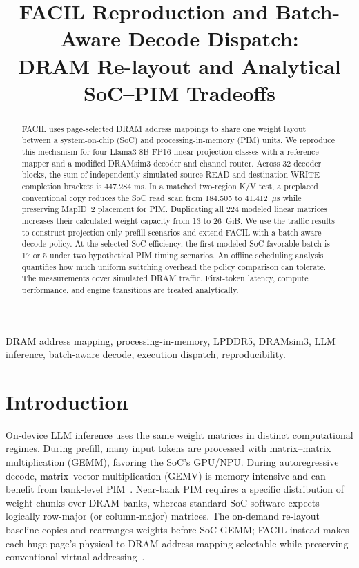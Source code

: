 \documentclass[conference,10pt]{IEEEtran}
\title{FACIL Reproduction and Batch-Aware Decode Dispatch:\\
DRAM Re-layout and Analytical SoC--PIM Tradeoffs}
\author{\IEEEauthorblockN{Sukhjot Singh, T S S Sreeja, Mayank Singh, and Pankaj}
\IEEEauthorblockA{Group 9, Department of Computer Science and Engineering\\
Indian Institute of Technology Guwahati}}
\newcommand{\facil}{FACIL}
\begin{document}
\maketitle
\begin{abstract}
FACIL uses page-selected DRAM address mappings to share one
weight layout between a system-on-chip (SoC) and processing-in-memory
(PIM) units. We reproduce this mechanism for four Llama3-8B FP16
linear projection classes with a reference mapper and a modified
DRAMsim3 decoder and channel router. Across 32 decoder blocks,
the sum of independently simulated source READ and destination WRITE
completion brackets is 447.284 ms. In a matched two-region K/V test,
a preplaced conventional copy reduces the SoC read scan from 184.505
to 41.412~$\mu$s while preserving MapID~2 placement for PIM.
Duplicating all 224 modeled linear matrices increases their calculated
weight capacity from 13 to 26~GiB. We use the traffic results to construct
projection-only prefill scenarios and extend FACIL with a batch-aware
decode policy. At the selected SoC efficiency, the first modeled
SoC-favorable batch is 17 or 5 under two hypothetical PIM timing
scenarios. An offline scheduling analysis quantifies how much uniform
switching overhead the policy comparison can tolerate. The measurements
cover simulated DRAM traffic. First-token latency, compute performance,
and engine transitions are treated analytically.
\end{abstract}

\begin{IEEEkeywords}
DRAM address mapping, processing-in-memory, LPDDR5, DRAMsim3,
LLM inference, batch-aware decode, execution dispatch, reproducibility.
\end{IEEEkeywords}

\section{Introduction}
On-device LLM inference uses the same weight matrices in distinct
computational regimes. During prefill, many input tokens are processed
with matrix--matrix multiplication (GEMM), favoring the SoC's GPU/NPU.
During autoregressive decode, matrix--vector multiplication (GEMV) is
memory-intensive and can benefit from bank-level PIM~\cite{facil}.
Near-bank PIM requires a specific distribution of weight chunks over
DRAM banks, whereas standard SoC software expects logically row-major
(or column-major) matrices. The on-demand re-layout baseline copies and
rearranges weights before SoC GEMM; \facil{} instead makes each huge
page's physical-to-DRAM address mapping selectable while preserving
conventional virtual addressing~\cite{facil}.
\end{document}
